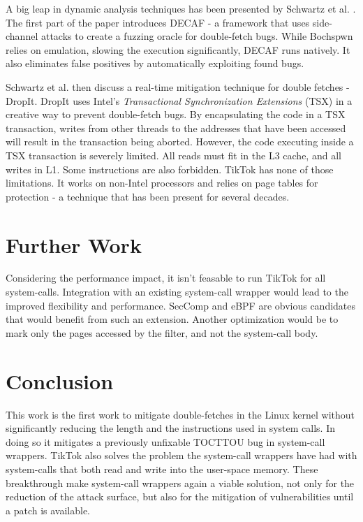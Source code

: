A big leap in dynamic analysis techniques has been presented by Schwartz et al.
\cite{schwarz2018automated}. The first part of the paper introduces DECAF - a
framework that uses side-channel attacks to create a fuzzing oracle for
double-fetch bugs. While Bochspwn relies on emulation, slowing the execution
significantly, DECAF runs natively. It also eliminates false positives by
automatically exploiting found bugs.

Schwartz et al. then discuss a real-time mitigation technique for double
fetches - DropIt. DropIt uses Intel's \emph{Transactional Synchronization 
Extensions} (TSX)\cite{intel64and} in a creative way to prevent double-fetch
bugs. By encapsulating the code in a TSX transaction, writes from other threads
to the addresses that have been accessed will result in the
transaction being aborted. However, the code executing inside a TSX transaction
is severely limited. All reads must fit in the L3 cache, and all writes in L1.
Some instructions are also forbidden. TikTok has none of those limitations.
It works on non-Intel processors and relies on page tables for protection - a
technique that has been present for several decades.

\section{Further Work}

Considering the performance impact, it isn't feasable to run TikTok for all
system-calls. Integration with an existing system-call wrapper would lead to the
improved flexibility and performance. SecComp\cite{seccomp} and eBPF\cite{ebpf}
are obvious candidates that would benefit from such an extension. Another
optimization would be to mark only the pages accessed by the filter, and not the
system-call body.

\section{Conclusion}

This work is the first work to mitigate double-fetches in the Linux kernel
without significantly reducing the length and the instructions used in system
calls. In doing so it mitigates a previously unfixable TOCTTOU bug in
system-call wrappers. TikTok also solves the problem the system-call wrappers
have had with system-calls that both read and write into the user-space memory.
These breakthrough make system-call wrappers again a viable solution, not only
for the reduction of the attack surface, but also for the mitigation of
vulnerabilities until a patch is available.

